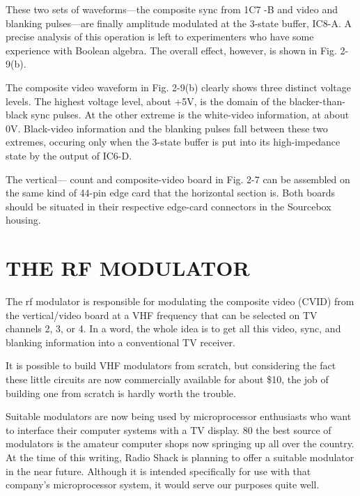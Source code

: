 \documentclass[11pt]{book}              %
\begin{document}
These two sets of waveforms—the composite sync from 1C7 -B and video and blanking pulses—are finally amplitude modulated at the 3-state buffer, IC8-A. A precise analysis of this operation is left to experimenters who have some experience with Boolean algebra. The overall effect, however, is shown in Fig. 2-9(b).

The composite video waveform in Fig. 2-9(b) clearly shows three distinct voltage levels. The highest voltage level, about +5V, is the domain of the blacker-than-black sync pulses. At the other extreme is the white-video information, at about 0V. Black-video information and the blanking pulses fall between these two extremes, occuring only when the 3-state buffer is put into its high-impedance state by the output of IC6-D.

The vertical— count and composite-video board in Fig. 2-7 can be assembled on the same kind of 44-pin edge card that the horizontal section is. Both boards should be situated in their respective edge-card connectors in the Sourcebox housing.


\section{THE RF MODULATOR}

The rf modulator is responsible for modulating the composite video (CVID) from the vertical/video board at a VHF frequency that can be selected on TV channels 2, 3, or 4. In a word, the whole idea is to get all this video, sync, and blanking information into a conventional TV receiver.


It is possible to build VHF modulators from scratch, but considering the fact these little circuits are now commercially available for about \$10, the job of building one from scratch is hardly worth the trouble.

Suitable modulators are now being used by microprocessor enthusiasts who want to interface their computer systems with a TV display. 80 the best source of modulators is the amateur computer shops now springing up all over the country. At the time of this writing, Radio Shack is planning to offer a suitable modulator in the near future. Although it is intended specifically for use with that company’s microprocessor system, it would serve our purposes quite well.
\end{document}
